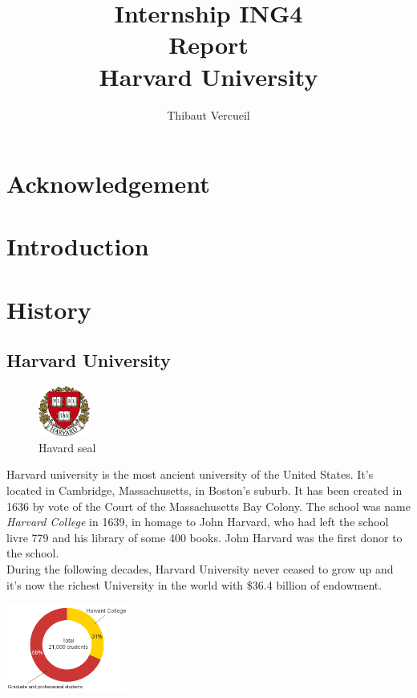 \documentclass[10pt,a4paper]{article}
\title{{\Huge Internship ING4}\\ Report\\ \vspace{1cm} Harvard University}
\author{Thibaut Vercueil}
\begin{document}
\maketitle
\newpage
\tableofcontents
\newpage
\section{Acknowledgement}

\section{Introduction}

\section{History}

\subsection{Harvard University}


\begin{figure}
\centering
\includegraphics[width=0.15\textwidth]{harvardlogo.png}
\caption*{Havard seal}
\end{figure}
Harvard university is the most ancient university of the United States. It's located in Cambridge, Massachusetts, in Boston's suburb. It has been created in 1636 by vote of the Court of the Massachusetts Bay Colony. The school was name \textit{Harvard College} in 1639, in homage to John Harvard, who had left the school livre 779 and his library of some 400 books. John Harvard was the first donor to the school.\\
During the following decades, Harvard University never ceased to grow up and it's now the richest University in the world with \$36.4 billion of endowment.


\includegraphics[width=0.3\textwidth]{images/fig1.png}
\end{document}
